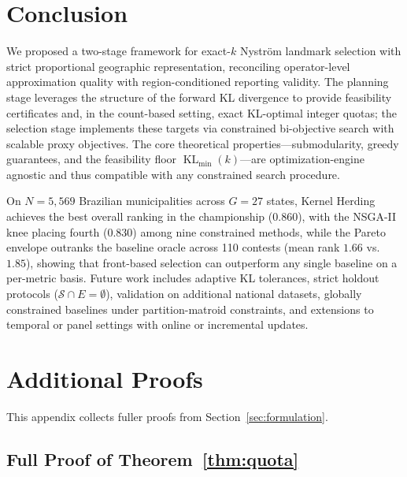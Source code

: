 \documentclass[10pt,journal]{IEEEtran}
\newcommand{\datasetN}{5{,}569}
\newcommand{\1}{\mathbf{1}}
\newcommand{\Sel}{\mathcal{S}}
\DeclareMathOperator{\KL}{KL}
\theoremstyle{ieeethm}
\begin{document}
\section{Conclusion}
\label{sec:conclusion}

We proposed a two-stage framework for exact-$k$ Nyström landmark selection with strict proportional geographic representation, reconciling operator-level approximation quality with region-conditioned reporting validity. The planning stage leverages the structure of the forward KL divergence to provide feasibility certificates and, in the count-based setting, exact KL-optimal integer quotas; the selection stage implements these targets via constrained bi-objective search with scalable proxy objectives. The core theoretical properties—submodularity, greedy guarantees, and the feasibility floor $\KL_{\min}(k)$—are optimization-engine agnostic and thus compatible with any constrained search procedure.

On $N{=}\datasetN$ Brazilian municipalities across $G{=}27$ states, Kernel Herding achieves the best overall ranking in the championship ($0.860$), with the NSGA-II knee placing fourth ($0.830$) among nine constrained methods, while the Pareto envelope outranks the baseline oracle across 110 contests (mean rank $1.66$ vs.\ $1.85$), showing that front-based selection can outperform any single baseline on a per-metric basis. Future work includes adaptive KL tolerances, strict holdout protocols ($\Sel\cap E = \emptyset$), validation on additional national datasets, globally constrained baselines under partition-matroid constraints, and extensions to temporal or panel settings with online or incremental updates.

\appendices

\section{Additional Proofs}
\label{app:additional_proofs}

This appendix collects fuller proofs from Section~\ref{sec:formulation}.

\subsection{Full Proof of Theorem~\ref{thm:quota}}
\end{document}
